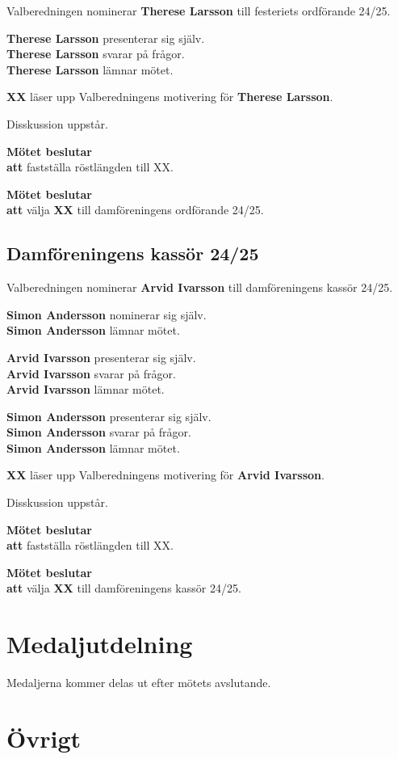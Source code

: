 \documentclass{datateknologsektionen-document}
\newcommand{\ind}{\hspace*{2em}}
\newcommand{\motetbeslutar}{\textbf{Mötet beslutar}}
\newcommand{\att}{\\\ind\textbf{att}}
\begin{document}
Valberedningen nominerar \textbf{Therese Larsson} till festeriets ordförande 24/25.

\textbf{Therese Larsson} presenterar sig själv.\\
\textbf{Therese Larsson} svarar på frågor.\\
\textbf{Therese Larsson} lämnar mötet.

\textbf{XX} läser upp Valberedningens motivering för \textbf{Therese Larsson}.

Disskussion uppstår.

\motetbeslutar
\att{} fastställa röstlängden till XX.

\motetbeslutar
\att{} välja \textbf{XX} till damföreningens ordförande 24/25.

\subsection{Damföreningens kassör 24/25}

Valberedningen nominerar \textbf{Arvid Ivarsson} till damföreningens kassör 24/25.

\textbf{Simon Andersson} nominerar sig själv. \\
\textbf{Simon Andersson} lämnar mötet.

\textbf{Arvid Ivarsson} presenterar sig själv.\\
\textbf{Arvid Ivarsson} svarar på frågor.\\
\textbf{Arvid Ivarsson} lämnar mötet.

\textbf{Simon Andersson} presenterar sig själv.\\
\textbf{Simon Andersson} svarar på frågor.\\
\textbf{Simon Andersson} lämnar mötet.

\textbf{XX} läser upp Valberedningens motivering för \textbf{Arvid Ivarsson}.

Disskussion uppstår.

\motetbeslutar
\att{} fastställa röstlängden till XX.

\motetbeslutar
\att{} välja \textbf{XX} till damföreningens kassör 24/25.

\pagebreak

\section{Medaljutdelning}
Medaljerna kommer delas ut efter mötets avslutande.

\section{Övrigt}
\end{document}
